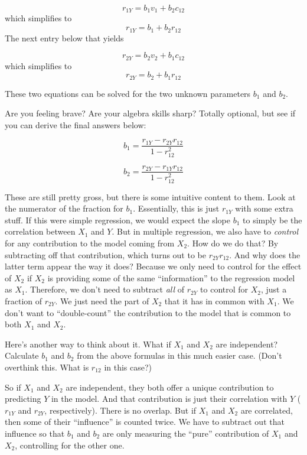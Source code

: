 \documentclass[
]{book}
\begin{document}
\[
r_{1Y} = b_{1} v_{1} + b_{2} c_{12}
\]
which simplifies to
\[
r_{1Y} = b_{1} + b_{2} r_{12}
\]
The next entry below that yields

\[
r_{2Y} = b_{2} v_{2} + b_{1} c_{12}
\]
which simplifies to
\[
r_{2Y} = b_{2} + b_{1} r_{12}
\]

These two equations can be solved for the two unknown parameters \(b_{1}\) and \(b_{2}\).

Are you feeling brave? Are your algebra skills sharp? Totally optional, but see if you can derive the final answers below:

\[
b_{1} = \frac{r_{1Y} - r_{2Y}r_{12}}{1 - r_{12}^{2}}
\]

\[
b_{2} = \frac{r_{2Y} - r_{1Y}r_{12}}{1 - r_{12}^{2}}
\]

These are still pretty gross, but there is some intuitive content to them. Look at the numerator of the fraction for \(b_{1}\). Essentially, this is just \(r_{1Y}\) with some extra stuff. If this were simple regression, we would expect the slope \(b_{1}\) to simply be the correlation between \(X_{1}\) and \(Y\). But in multiple regression, we also have to \emph{control} for any contribution to the model coming from \(X_{2}\). How do we do that? By subtracting off that contribution, which turns out to be \(r_{2Y}r_{12}\). And why does the latter term appear the way it does? Because we only need to control for the effect of \(X_{2}\) if \(X_{2}\) is providing some of the same ``information'' to the regression model as \(X_{1}\). Therefore, we don't need to subtract \emph{all} of \(r_{2Y}\) to control for \(X_{2}\), just a fraction of \(r_{2Y}\). We just need the part of \(X_{2}\) that it has in common with \(X_{1}\). We don't want to ``double-count'' the contribution to the model that is common to both \(X_{1}\) and \(X_{2}\).

Here's another way to think about it. What if \(X_{1}\) and \(X_{2}\) are independent? Calculate \(b_{1}\) and \(b_{2}\) from the above formulas in this much easier case. (Don't overthink this. What is \(r_{12}\) in this case?)

So if \(X_{1}\) and \(X_{2}\) are independent, they both offer a unique contribution to predicting \(Y\) in the model. And that contribution is just their correlation with \(Y\) (\(r_{1Y}\) and \(r_{2Y}\), respectively). There is no overlap. But if \(X_{1}\) and \(X_{2}\) are correlated, then some of their ``influence'' is counted twice. We have to subtract out that influence so that \(b_{1}\) and \(b_{2}\) are only measuring the ``pure'' contribution of \(X_{1}\) and \(X_{2}\), controlling for the other one.
\end{document}
